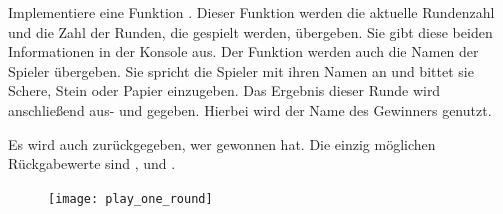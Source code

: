 \documentclass[a4paper, DIV = calc]{scrartcl}
\begin{document}
%
%
%
%
%
%

\begin{aufgabe} \noindent 
Implementiere eine Funktion . Dieser Funktion werden die aktuelle Rundenzahl und die Zahl der Runden, die gespielt werden, übergeben. Sie gibt diese beiden Informationen in der Konsole aus. Der Funktion werden auch die Namen der Spieler übergeben. Sie spricht die Spieler mit ihren Namen an und bittet sie Schere, Stein oder Papier einzugeben. Das Ergebnis dieser Runde wird anschließend aus- und gegeben. Hierbei wird der Name des Gewinners genutzt.

Es wird auch zurückgegeben, wer gewonnen hat. Die einzig möglichen Rückgabewerte sind  ,  und .

\begin{figure}[H]
	\centering	
	\texttt{[image: play\_one\_round]}

\end{figure}


\end{aufgabe}
\end{document}
